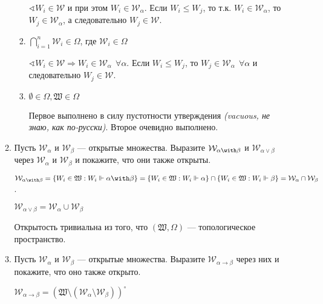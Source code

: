 \begin{enumerate}[wide, labelwidth=!, labelindent=0pt]
\begin{enumerate}
\begin{enumerate}
                                    \(\sphericalangle W_i \in \mathcal{W}\) и при этом \(W_i\in \mathcal{W}_\alpha\). Если \(W_i \leq W_j\), то т.к. \(W_i \in \mathcal{W}_\alpha\), то \(W_j \in \mathcal{W}_\alpha\), а следовательно \(W_j \in \mathcal{W}\).

                              \item \(\bigcap_{i = 1}^{n} \mathcal{W}_i \in \Omega\), где \(\mathcal{W}_i \in\Omega\)

                                    \(\sphericalangle W_i \in \mathcal{W} \Rightarrow W_i \in \mathcal{W}_\alpha \ \ \forall \alpha\). Если \(W_i \leq W_j\), то \(W_j \in \mathcal{W}_\alpha \ \ \forall \alpha\) и следовательно \(W_j \in \mathcal{W}\).

                              \item \(\emptyset\in\Omega, \mathfrak{W}\in \Omega\)

                                    Первое выполнено в силу пустотности утверждения \textit{(vacuous, не знаю, как по-русски)}. Второе очевидно выполнено.
                        \end{enumerate}

                  \item Пусть $\mathcal{W}_\alpha$ и $\mathcal{W}_\beta$ --- открытые множества. Выразите $\mathcal{W}_{\alpha\with\beta}$ и $\mathcal{W}_{\alpha\vee\beta}$
                        через $\mathcal{W}_\alpha$ и $\mathcal{W}_\beta$ и покажите, что они также открыты.

                        \(\mathcal{W}_{\alpha \with \beta} = \{W_i \in \mathfrak{W} : W_i \Vdash \alpha \with \beta\} = \{W_i \in \mathfrak{W} : W_i \Vdash \alpha\} \cap \{W_i \in \mathfrak{W} : W_i \Vdash \beta\} = \mathcal{W}_\alpha \cap \mathcal{W}_\beta\).

                        \(\mathcal{W}_{\alpha \lor \beta} = \mathcal{W}_\alpha \cup \mathcal{W}_\beta\)

                        Открытость тривиальна из того, что \((\mathfrak{W}, \Omega)\) --- топологическое пространство.

                  \item Пусть $\mathcal{W}_\alpha$ и $\mathcal{W}_\beta$ --- открытые множества. Выразите $\mathcal{W}_{\alpha\rightarrow\beta}$ через
                        них и покажите, что оно также открыто.

                        \(\mathcal{W}_{\alpha \to \beta} = (\mathfrak{W} \setminus (\mathcal{W}_\alpha \setminus \mathcal{W}_\beta))^\circ\)


\end{enumerate}
\end{enumerate}
